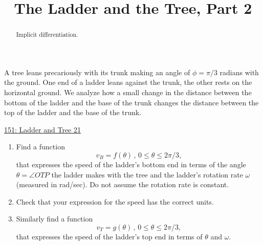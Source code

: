 \documentclass{ximera}
\title{The Ladder and the Tree, Part 2}
\begin{document}
\begin{abstract}
Implicit differentiation.
\end{abstract}
\maketitle

\begin{question} \label{Q43hhbdsfdsfdszz}

A tree leans precariously with its trunk making an angle of $\phi = \pi/3$ radians with the ground. One end of a ladder leans against the trunk, the other rests on the horizontal ground. We analyze how a small change in the distance between the bottom of the ladder and the base of the trunk changes the distance between the top of the ladder and the base of the trunk.


 
\begin{onlineOnly}
   \begin{center}
\end{center}
\end{onlineOnly}

\href{https://www.desmos.com/calculator/bscbpblji1}{151: Ladder and Tree 21}


\begin{enumerate}
\item Find a function
\[
    v_B = f(\theta) \, , \,  0\leq \theta \leq 2\pi/3 ,
\]
that expresses the speed of the ladder's bottom end in terms of the angle $\theta = \angle OTP$ the ladder makes with the tree and the ladder's rotation rate $\omega$ (measured in rad/sec). Do not assume the rotation rate is constant.

\item Check that your expression for the speed has the correct units.

\item Similarly find a function 
\[
    v_T = g(\theta) \, , \,  0\leq \theta \leq 2\pi/3 ,
\]
that expresses the speed of the ladder's top end in terms of $\theta$ and $\omega$.


\end{enumerate}
\end{question}
\end{document}
